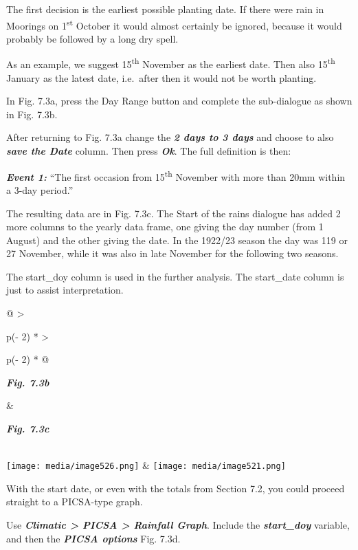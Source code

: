 \documentclass[
  letterpaper,
  DIV=11,
  numbers=noendperiod]{scrreprt}
\begin{document}
The first decision is the earliest possible planting date. If there were
rain in Moorings on 1\textsuperscript{st} October it would almost
certainly be ignored, because it would probably be followed by a long
dry spell.

As an example, we suggest 15\textsuperscript{th} November as the
earliest date. Then also 15\textsuperscript{th} January as the latest
date, i.e.~after then it would not be worth planting.

In Fig. 7.3a, press the Day Range button and complete the sub-dialogue
as shown in Fig. 7.3b.

After returning to Fig. 7.3a change the \textbf{\emph{2 days to 3 days}}
and choose to also \textbf{\emph{save the Date}} column. Then press
\textbf{\emph{Ok}}. The full definition is then:

\textbf{\emph{Event 1:}} ``The first occasion from
15\textsuperscript{th} November with more than 20mm within a 3-day
period.''

The resulting data are in Fig. 7.3c. The Start of the rains dialogue has
added 2 more columns to the yearly data frame, one giving the day number
(from 1 August) and the other giving the date. In the 1922/23 season the
day was 119 or 27 November, while it was also in late November for the
following two seasons.

The start\_doy column is used in the further analysis. The start\_date
column is just to assist interpretation.

\begin{longtable}[]{@{}
  >{\raggedright\arraybackslash}p{(\columnwidth - 2\tabcolsep) * }
  >{\raggedright\arraybackslash}p{(\columnwidth - 2\tabcolsep) * }@{}}
\toprule\noalign{}
\begin{minipage}[b]{\linewidth}\raggedright
\textbf{\emph{Fig. 7.3b}}
\end{minipage} & \begin{minipage}[b]{\linewidth}\raggedright
\textbf{\emph{Fig. 7.3c}}
\end{minipage} \\
\midrule\noalign{}
\endhead
\bottomrule\noalign{}
\endlastfoot
\texttt{[image: media/image526.png]} &
\texttt{[image: media/image521.png]} \\
\end{longtable}

With the start date, or even with the totals from Section 7.2, you could
proceed straight to a PICSA-type graph.

Use \textbf{\emph{Climatic \textgreater{} PICSA \textgreater{} Rainfall
Graph}}. Include the \textbf{\emph{start\_doy}} variable, and then the
\textbf{\emph{PICSA options}} Fig. 7.3d.
\end{document}
